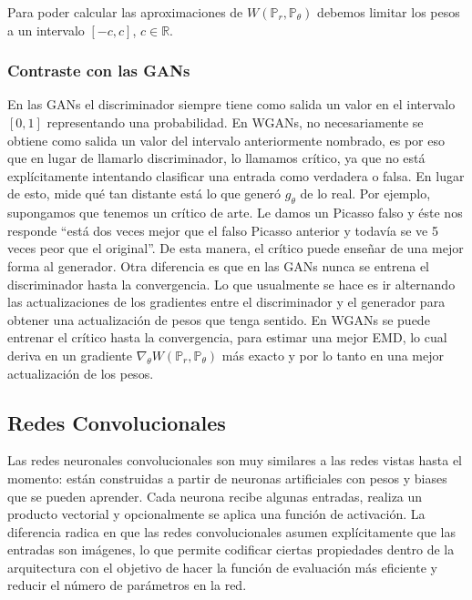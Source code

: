 \documentclass[spanish]{report}
\begin{document}
\noindent Para poder calcular las aproximaciones de $W(\mathbb{P}_{r}, \mathbb{P}_{\theta})$ debemos limitar los pesos a un intervalo $[-c, c]$, $c \in \mathbb{R}$.


\subsubsection{Contraste con las GANs}

En las GANs el discriminador siempre tiene como salida un valor en el intervalo $[0, 1]$ representando una probabilidad. En WGANs, no necesariamente se obtiene como salida un valor del intervalo anteriormente nombrado, es por eso que en lugar de llamarlo discriminador, lo llamamos crítico, ya que no está explícitamente intentando clasificar una entrada como verdadera o falsa. En lugar de esto, mide qué tan distante está lo que generó $g_{\theta}$ de lo real. Por ejemplo, supongamos que tenemos un crítico de arte. Le damos un Picasso falso y éste nos responde “está dos veces mejor que el falso Picasso anterior y todavía se ve 5 veces peor que el original”. De esta manera, el crítico puede enseñar de una mejor forma al generador.
\newpage
Otra diferencia es que en las GANs nunca se entrena el discriminador hasta la convergencia. Lo que usualmente se hace es ir alternando las actualizaciones de los gradientes entre el discriminador y el generador para obtener una actualización de pesos que tenga sentido. En WGANs se puede entrenar el crítico hasta la convergencia, para estimar una mejor EMD, lo cual deriva en un gradiente $\nabla_{\theta} W(\mathbb{P}_{r}, \mathbb{P}_{\theta})$ más exacto y por lo tanto en una mejor actualización de los pesos.

\subsection{Redes Convolucionales}

Las redes neuronales convolucionales \cite{curso_stanford} \cite{web_conv} son muy similares a las redes vistas hasta el momento: están construidas a partir de neuronas artificiales con pesos y biases que se pueden aprender. Cada neurona recibe algunas entradas, realiza un producto vectorial y opcionalmente se aplica una función de activación. La diferencia radica en que las redes convolucionales asumen explícitamente que las entradas son imágenes, lo que permite codificar ciertas propiedades dentro de la arquitectura con el objetivo de hacer la función de evaluación más eficiente y reducir el número de parámetros en la red.
\end{document}
